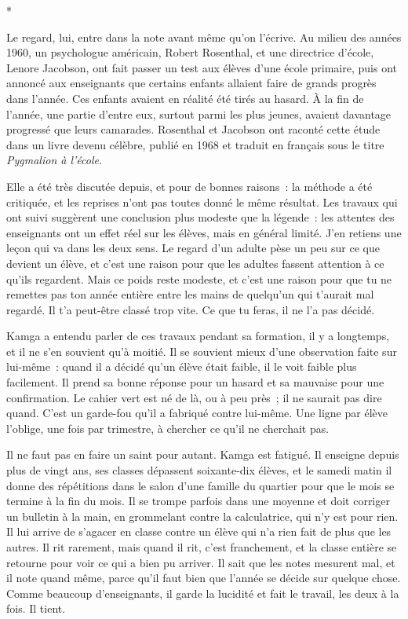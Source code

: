 \documentclass[10.5pt,twoside,openright]{book}
\newcommand{\asterisme}{\par\vspace{0.7em}\centerline{\color{gris}*\quad*\quad*}\vspace{0.7em}\par\noindent}
\begin{document}
\asterisme

Le regard, lui, entre dans la note avant même qu’on l’écrive. Au milieu des années 1960, un psychologue américain, Robert Rosenthal, et une directrice d’école, Lenore Jacobson, ont fait passer un test aux élèves d’une école primaire, puis ont annoncé aux enseignants que certains enfants allaient faire de grands progrès dans l’année. Ces enfants avaient en réalité été tirés au hasard. À la fin de l’année, une partie d’entre eux, surtout parmi les plus jeunes, avaient davantage progressé que leurs camarades. Rosenthal et Jacobson ont raconté cette étude dans un livre devenu célèbre, publié en 1968 et traduit en français sous le titre \emph{Pygmalion à l’école}.

Elle a été très discutée depuis, et pour de bonnes raisons : la méthode a été critiquée, et les reprises n’ont pas toutes donné le même résultat. Les travaux qui ont suivi suggèrent une conclusion plus modeste que la légende : les attentes des enseignants ont un effet réel sur les élèves, mais en général limité. J’en retiens une leçon qui va dans les deux sens. Le regard d’un adulte pèse un peu sur ce que devient un élève, et c’est une raison pour que les adultes fassent attention à ce qu’ils regardent. Mais ce poids reste modeste, et c’est une raison pour que tu ne remettes pas ton année entière entre les mains de quelqu’un qui t’aurait mal regardé. Il t’a peut-être classé trop vite. Ce que tu feras, il ne l’a pas décidé.

Kamga a entendu parler de ces travaux pendant sa formation, il y a longtemps, et il ne s’en souvient qu’à moitié. Il se souvient mieux d’une observation faite sur lui-même : quand il a décidé qu’un élève était faible, il le voit faible plus facilement. Il prend sa bonne réponse pour un hasard et sa mauvaise pour une confirmation. Le cahier vert est né de là, ou à peu près ; il ne saurait pas dire quand. C’est un garde-fou qu’il a fabriqué contre lui-même. Une ligne par élève l’oblige, une fois par trimestre, à chercher ce qu’il ne cherchait pas.

Il ne faut pas en faire un saint pour autant. Kamga est fatigué. Il enseigne depuis plus de vingt ans, ses classes dépassent soixante-dix élèves, et le samedi matin il donne des répétitions dans le salon d’une famille du quartier pour que le mois se termine à la fin du mois. Il se trompe parfois dans une moyenne et doit corriger un bulletin à la main, en grommelant contre la calculatrice, qui n’y est pour rien. Il lui arrive de s’agacer en classe contre un élève qui n’a rien fait de plus que les autres. Il rit rarement, mais quand il rit, c’est franchement, et la classe entière se retourne pour voir ce qui a bien pu arriver. Il sait que les notes mesurent mal, et il note quand même, parce qu’il faut bien que l’année se décide sur quelque chose. Comme beaucoup d’enseignants, il garde la lucidité et fait le travail, les deux à la fois. Il tient.
\end{document}
